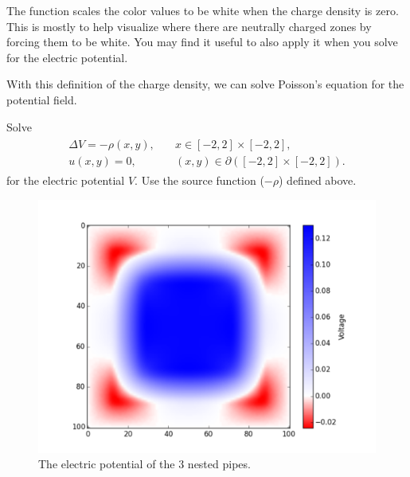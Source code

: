 The function  scales the color values to be white when the charge density is zero.
This is mostly to help visualize where there are neutrally charged zones by forcing them to be white.
You may find it useful to also apply it when you solve for the electric  potential.

With this definition of the charge density, we can solve Poisson's equation for the potential field.

\begin{problem}
Solve 
\begin{align}
	\begin{split}
	\Delta V = -\rho(x,y), &{}\quad x \in [-2,2]\times [-2,2],\\
	u(x,y) = 0, &{}\quad (x,y) \in \partial ([-2,2]\times [-2,2]).
	\end{split}
	\label{poisson2d:source}
\end{align}
% 
for the electric potential $V.$
Use the source function ($-\rho$) defined above. %
\end{problem}

\begin{figure}
\includegraphics[width=\textwidth]{pipesV.pdf}
\caption{The electric potential of the 3 nested pipes.}
\end{figure}
